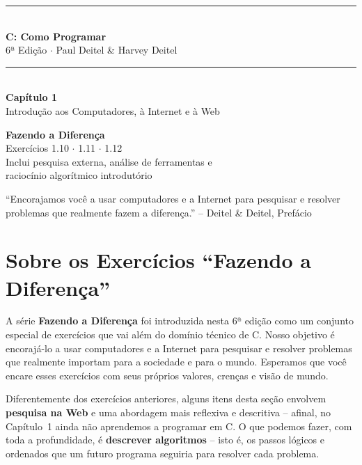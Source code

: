 \documentclass[12pt,a4paper]{article}
\begin{document}
\begin{titlepage}
  \centering
  \vspace*{2cm}
  {\color{deitelblue}\rule{\linewidth}{2pt}}\\[0.4cm]
  {\huge\bfseries\color{deitelblue} C: Como Programar}\\[0.2cm]
  {\large\color{deitelblue} 6ª Edição $\cdot$ Paul Deitel \& Harvey Deitel}\\[0.2cm]
  {\color{deitelblue}\rule{\linewidth}{2pt}}\\[1cm]
  {\LARGE\bfseries Capítulo 1}\\[0.3cm]
  {\Large\color{deitelblue!80} Introdução aos Computadores, à Internet e à Web}\\[0.8cm]
  \begin{tcolorbox}[colback=ecolightgreen,colframe=ecogreen,width=0.85\linewidth]
    \centering
    {\large\bfseries\color{ecogreen} Fazendo a Diferença}\\[0.3cm]
    {\normalsize Exercícios 1.10 $\cdot$ 1.11 $\cdot$ 1.12}\\[0.2cm]
    {\small Inclui pesquisa externa, análise de ferramentas e\\
    raciocínio algorítmico introdutório}
  \end{tcolorbox}
  \vfill
  {\small\color{deitelblue} ``Encorajamos você a usar computadores e a Internet para pesquisar e
  resolver\\problemas que realmente fazem a diferença.'' -- Deitel \& Deitel, Prefácio}
\end{titlepage}

\section*{Sobre os Exercícios ``Fazendo a Diferença''}

A série \textbf{Fazendo a Diferença} foi introduzida nesta 6ª edição como um conjunto
especial de exercícios que vai além do domínio técnico de C. Nosso objetivo é
encorajá-lo a usar computadores e a Internet para pesquisar e resolver problemas que
realmente importam para a sociedade e para o mundo. Esperamos que você encare esses
exercícios com seus próprios valores, crenças e visão de mundo.

Diferentemente dos exercícios anteriores, alguns itens desta seção envolvem
\textbf{pesquisa na Web} e uma abordagem mais reflexiva e descritiva -- afinal,
no Capítulo~1 ainda não aprendemos a programar em C. O que podemos fazer, com toda
a profundidade, é \textbf{descrever algoritmos} -- isto é, os passos lógicos e
ordenados que um futuro programa seguiria para resolver cada problema.
\end{document}
